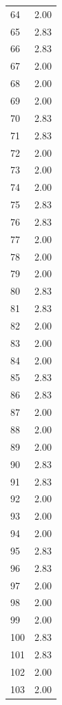 \documentclass[a4paper,11pt]{article}
\begin{document}
\begin{center}
\begin{longtable}{|R{1.5cm}|R{2.5cm}|}
   64  &         2.00 \\ 
   65  &         2.83 \\ 
   66  &         2.83 \\ 
   67  &         2.00 \\ 
   68  &         2.00 \\ 
   69  &         2.00 \\ 
   70  &         2.83 \\ 
   71  &         2.83 \\ 
   72  &         2.00 \\ 
   73  &         2.00 \\ 
   74  &         2.00 \\ 
   75  &         2.83 \\ 
   76  &         2.83 \\ 
   77  &         2.00 \\ 
   78  &         2.00 \\ 
   79  &         2.00 \\ 
   80  &         2.83 \\ 
   81  &         2.83 \\ 
   82  &         2.00 \\ 
   83  &         2.00 \\ 
   84  &         2.00 \\ 
   85  &         2.83 \\ 
   86  &         2.83 \\ 
   87  &         2.00 \\ 
   88  &         2.00 \\ 
   89  &         2.00 \\ 
   90  &         2.83 \\ 
   91  &         2.83 \\ 
   92  &         2.00 \\ 
   93  &         2.00 \\ 
   94  &         2.00 \\ 
   95  &         2.83 \\ 
   96  &         2.83 \\ 
   97  &         2.00 \\ 
   98  &         2.00 \\ 
   99  &         2.00 \\ 
  100  &         2.83 \\ 
  101  &         2.83 \\ 
  102  &         2.00 \\ 
  103  &         2.00 \\ 

\end{longtable}
\end{center}
\end{document}
